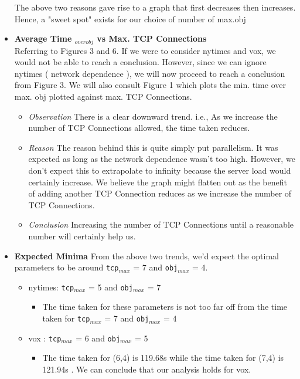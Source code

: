 \documentclass[12pt]{article}
\begin{document}
\begin{itemize}
\begin{itemize}
\end{itemize}
The above two reasons gave rise to a graph that first decreases then increases. Hence, a "sweet spot" exists for our choice of number of max.obj
\item \textbf{Average Time $_{over obj}$ vs Max. TCP Connections}\\
Referring to Figures 3 and 6. If we were to consider nytimes and vox, we would not be able to reach a conclusion. However, since we can ignore nytimes ( network dependence ), we will now proceed to reach a conclusion from Figure 3. We will also consult Figure 1 which plots the min. time over max. obj plotted against max. TCP Connections.
\begin{itemize}
\item \textit{Observation} There is a clear downward trend. i.e., As we increase the number of TCP Connections allowed, the time taken reduces.
\item \textit{Reason} The reason behind this is quite simply put parallelism. It was expected as long as the network dependence wasn't too high. However, we don't expect this to extrapolate to infinity because the server load would certainly increase. We believe the graph might flatten out as the benefit of adding another TCP Connection reduces as we increase the number of TCP Connections.
\item \textit{Conclusion} Increasing the number of TCP Connections until a reasonable number will certainly help us.
\end{itemize}
\item \textbf{Expected Minima} From the above two trends, we'd expect the optimal parameters to be around \texttt{tcp}$_{max}$ = 7 and \texttt{obj}$_{max}$ = 4.
\begin{itemize}
\item nytimes: \texttt{tcp}$_{max}$ = 5 and \texttt{obj}$_{max}$ = 7
\\ \begin{itemize}
\item The time taken for these parameters is not too far off from the time taken for \texttt{tcp}$_{max}$ = 7 and \texttt{obj}$_{max}$ = 4
\end{itemize}
\item vox : \texttt{tcp}$_{max}$ = 6 and \texttt{obj}$_{max}$ = 5
\\ \begin{itemize}
\item The time taken for (6,4) is 119.68s while the time taken for (7,4) is 121.94s . We can conclude that our analysis holds for vox.
\end{itemize}
\end{itemize}

\end{itemize}
\end{document}
